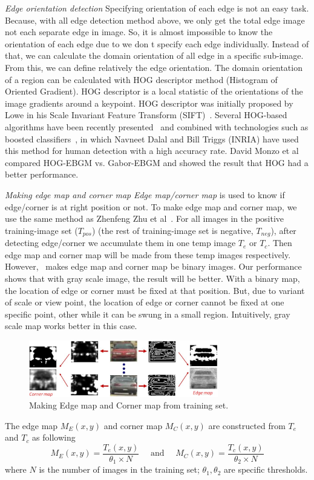 \textit{Edge orientation detection }
Specifying orientation of each edge is not an easy task. Because,
with all edge detection method above, we only get the total edge
image not each separate edge in image. So, it is almost impossible to
know the orientation of each edge due to we don t specify each edge
individually. Instead of that, we can calculate the domain orientation
of all edge in a specific sub-image. From this, we can define
relatively the edge orientation. The domain orientation of a region
can be calculated with HOG descriptor method (Histogram of
Oriented Gradient). HOG descriptor is a local statistic of the
orientations of the image gradients around a keypoint. HOG
descriptor was initially proposed by Lowe in his Scale Invariant
Feature Transform (SIFT)~\cite{lowe2004distintive}. Several HOG-based algorithms have
been recently presented~\cite{bay2008surf} and combined with technologies such as
boosted classifiers~\cite{dalal2005histograms}, in which Navneet Dalal and Bill Triggs (INRIA) have
used this method for human detection with a high accuracy rate.
David Monzo et al~\cite{monzo2008hog} compared HOG-EBGM vs. Gabor-EBGM
and showed the result that HOG had a better performance.

\textit{Making edge map and corner map }
\textit{Edge map/corner map} is used to know if edge/corner is at right
position or not. To make edge map and corner map, we use the same
method as Zhenfeng Zhu et al~\cite{zhu2004car}. For all images in the positive
training-image set ($T_{pos}$) (the rest of training-image set is negative,
$T_{neg}$), after detecting edge/corner we accumulate them in one temp
image $T_{e}$ or $T_{c}$. Then edge map and corner map will be made from
these temp images respectively. However,~\cite{zhu2004car} makes edge map and
corner map be binary images. Our performance shows that with gray
scale image, the result will be better. With a binary map, the location
of edge or corner must be fixed at that position. But, due to variant
of scale or view point, the location of edge or corner cannot be fixed
at one specific point, other while it can be swung in a small region.
Intuitively, gray scale map works better in this case.
\begin{figure}[ht]
  \centering
  \includegraphics[width=3.25in]{images/edgemap_cornermap.jpg}
  \caption{Making Edge map and Corner map from training set.}
  \label{fig:making_edge_corner_map}
\end{figure}
The edge map $M_{E}(x,y)$ and corner map $M_{C}(x,y)$ are constructed from
$T_{e}$ and $T_{c}$ as following
\begin{equation}
M_E(x,y) = \frac{T_{e}(x,y)}{\theta_1 \times N} \mbox{~~~~and~~~~}
M_C(x,y) = \frac{T_{c}(x,y)}{\theta_2 \times N}
   \label{eq:edge_corner_map}
\end{equation}
where $N$ is the number of images in the training set; $\theta_1, \theta_2$ are
specific thresholds. %
